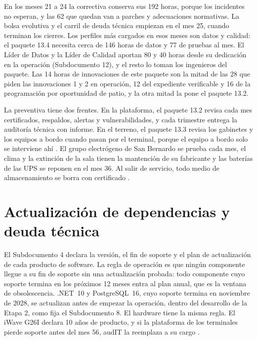 En los meses 21 a 24 la correctiva conserva sus 192 horas, porque los incidentes no esperan, y las 62
que quedan van a parches y adecuaciones normativas. La bolsa evolutiva y el carril de deuda técnica
empiezan en el mes 25, cuando terminan los cierres. Los perfiles más cargados en esos meses son datos y
calidad: el paquete 13.4 necesita cerca de 146 horas de datos y 77 de pruebas al mes. El Líder de Datos
y la Líder de Calidad aportan 80 y 40 horas desde su dedicación en la operación (Subdocumento 12), y el
resto lo toman los ingenieros del paquete. Las 14 horas de innovaciones de este paquete son la mitad de
las 28 que piden las innovaciones 1 y 2 en operación, 12 del expediente verificable y 16 de la
programación por oportunidad de patio, y la otra mitad la pone el paquete 13.2.

La preventiva tiene dos frentes. En la plataforma, el paquete 13.2 revisa cada mes certificados,
respaldos, alertas y vulnerabilidades, y cada trimestre entrega la auditoría técnica con informe. En el
terreno, el paquete 13.3 revisa los gabinetes y los equipos a bordo cuando pasan por el terminal, porque
el equipo a bordo solo se interviene ahí . El grupo electrógeno de San Bernardo se
prueba cada mes, el clima y la extinción de la sala tienen la mantención de su fabricante y las baterías
de las UPS se reponen en el mes 36. Al salir de servicio, todo medio de almacenamiento se borra con
certificado .

\section{Actualización de dependencias y deuda técnica}\label{sec:11-actualizacion-de-dependencias-y-}

El Subdocumento 4 declara la versión, el fin de soporte y el plan de actualización de cada producto de
software. La regla de operación es que ningún componente llegue a su fin de soporte sin una actualización
probada: todo componente cuyo soporte termina en los próximos 12 meses entra al plan anual, que es la
ventana de obsolescencia. .NET~10 y PostgreSQL~16, cuyo soporte termina en noviembre de 2028, se
actualizan antes de empezar la operación, dentro del desarrollo de la Etapa 2, como fija el Subdocumento
8. El hardware tiene la misma regla. El iWave G26I declara 10 años de producto, y si la plataforma de
los terminales pierde soporte antes del mes 56, audIT la reemplaza a su cargo .

